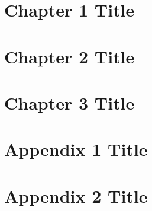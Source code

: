 \chapter*{}


\begin{abstract}
    
\end{abstract}



\tableofcontents
\newpage

\chapter{Chapter 1 Title}


\chapter{Chapter 2 Title}


\chapter{Chapter 3 Title}


\appendix
\chapter{Appendix 1 Title}


\chapter{Appendix 2 Title}


\newpage




